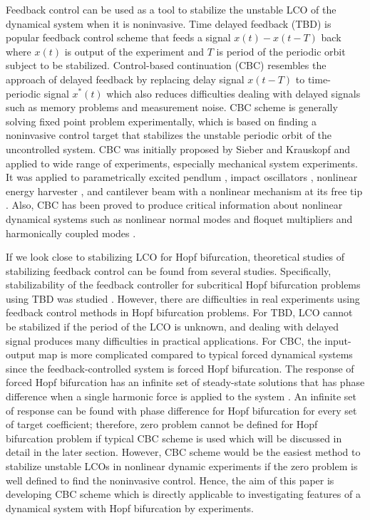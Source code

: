 \documentclass[openacc]{rsproca_new}%
\begin{document}
Feedback control can be used as a tool to stabilize the unstable LCO of the dynamical system when it is noninvasive. Time delayed feedback (TBD) \cite{pyragas2006delayed,sieber2016generic} is popular feedback control scheme that feeds a signal $x(t)-x(t-T)$ back where $x(t)$ is output of the experiment and $T$ is period of the periodic orbit subject to be stabilized. Control-based continuation (CBC) resembles the approach of delayed feedback by replacing delay signal $x(t-T)$ to time-periodic signal $x^*(t)$ which also reduces difficulties dealing with delayed signals such as memory problems and measurement noise. CBC scheme is generally solving fixed point problem experimentally, which is based on finding a noninvasive control target that stabilizes the unstable periodic orbit of the uncontrolled system. CBC was initially proposed by Sieber and Krauskopf \cite{sieber2008control} and applied to wide range of experiments, especially mechanical system experiments. It was applied to parametrically excited pendlum \cite{sieber2011control}, impact oscillators \cite{bureau2013experimental,bureau2014experimental}, nonlinear energy harvester \cite{barton2013systematic,barton2011numerical}
, and cantilever beam with a nonlinear mechanism at its free tip \cite{renson2019application}. Also, CBC has been proved to produce critical information about nonlinear dynamical systems such as nonlinear normal modes \cite{renson2016robust,renson2016experimental} and floquet multipliers \cite{barton2017control} and harmonically coupled modes \cite{renson2019application}.

If we look close to stabilizing LCO for Hopf bifurcation, theoretical studies of stabilizing feedback control can be found from several studies. Specifically, stabilizability of the feedback controller for subcritical Hopf bifurcation problems using TBD was studied \cite{brown2011time,postlethwaite2013feedback}. However, there are difficulties in real experiments using feedback control methods in Hopf bifurcation problems. For TBD, LCO cannot be stabilized if the period of the LCO is unknown, and dealing with delayed signal produces many difficulties in practical applications. For CBC, the input-output map is more complicated compared to typical forced dynamical systems since the feedback-controlled system is forced Hopf bifurcation. The response of forced Hopf bifurcation has an infinite set of steady-state solutions that has phase difference when a single harmonic force is applied to the system \cite{golubitsky2009feed}. An infinite set of response can be found with phase difference for Hopf bifurcation for every set of target coefficient; therefore, zero problem cannot be defined for Hopf bifurcation problem if typical CBC scheme is used which will be discussed in detail in the later section. However, CBC scheme would be the easiest method to stabilize unstable LCOs in nonlinear dynamic experiments if the zero problem is well defined to find the noninvasive control. Hence, the aim of this paper is developing CBC scheme which is directly applicable to investigating features of a dynamical system with Hopf bifurcation by experiments.
\end{document}
